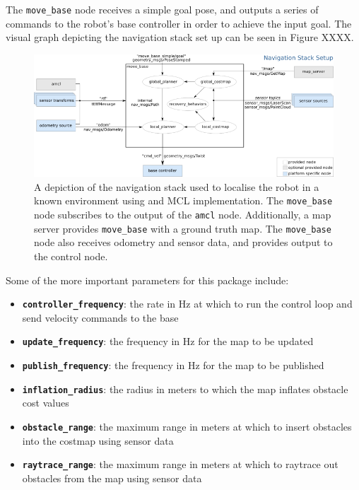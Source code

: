 \documentclass[a4paper]{article}
\begin{document}
The \texttt{move\_base} node receives a simple goal pose, and outputs a series of commands to the robot's base controller in order to achieve the input goal. The visual graph depicting the navigation stack set up can be seen in Figure XXXX.
\begin{figure}[h]
\centering
\includegraphics[scale=0.7]{move_base}
\caption{A depiction of the navigation stack used to localise the robot in a known environment using and MCL implementation. The \texttt{move\_base} node subscribes to the output of the \texttt{amcl} node. Additionally, a map server provides \texttt{move\_base} with a ground truth map. The \texttt{move\_base} node also receives odometry and sensor data, and provides output to the control node.}
\end{figure}

Some of the more important parameters for this package include:
\begin{itemize}
\item \textbf{\texttt{controller\_frequency}}: the rate in $\si{\hertz}$ at which to run the control loop and send velocity commands to the base
\item \textbf{\texttt{update\_frequency}}: the frequency in $\si{\hertz}$ for the map to be updated
\item \textbf{\texttt{publish\_frequency}}: the frequency in $\si{\hertz}$ for the map to be published
\item \textbf{\texttt{inflation\_radius}}: the radius in meters to which the map inflates obstacle cost values
\item \textbf{\texttt{obstacle\_range}}: the maximum range in meters at which to insert obstacles into the costmap using sensor data
\item \textbf{\texttt{raytrace\_range}}: the maximum range in meters at which to raytrace out obstacles from the map using sensor data
\end{itemize}
\end{document}
